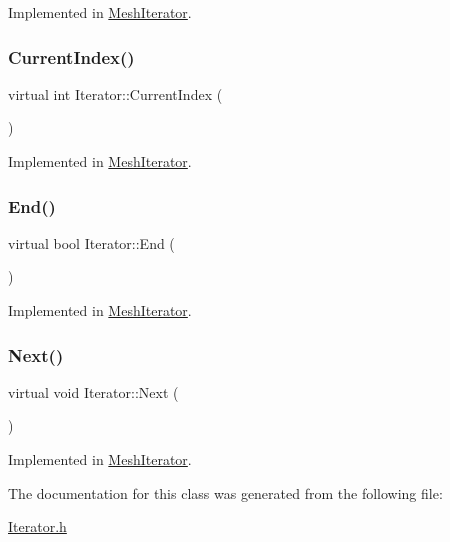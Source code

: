 Implemented in \mbox{\hyperlink{class_mesh_iterator_a07a9e1405ac4297b6300875b9084d946}{Mesh\+Iterator}}.

\mbox{\label{class_iterator_a5254a8ede30314e572c5f35e3a7f8e8c}} 
\subsubsection{\texorpdfstring{CurrentIndex()}{CurrentIndex()}}
{\footnotesize\ttfamily virtual int Iterator\+::\+Current\+Index (\begin{DoxyParamCaption}{ }\end{DoxyParamCaption})\hspace{0.3cm}{\ttfamily [pure virtual]}}



Implemented in \mbox{\hyperlink{class_mesh_iterator_a72853e5e422c2e0bdb1fc084d7fb5118}{Mesh\+Iterator}}.

\mbox{\label{class_iterator_a7cebd24c11b2f4577f72e228f849d092}} 
\subsubsection{\texorpdfstring{End()}{End()}}
{\footnotesize\ttfamily virtual bool Iterator\+::\+End (\begin{DoxyParamCaption}{ }\end{DoxyParamCaption})\hspace{0.3cm}{\ttfamily [pure virtual]}}



Implemented in \mbox{\hyperlink{class_mesh_iterator_aab37f952147b0b24bd22e469f23605fd}{Mesh\+Iterator}}.

\mbox{\label{class_iterator_a124e522942b3a5f058ad9091fe74c283}} 
\subsubsection{\texorpdfstring{Next()}{Next()}}
{\footnotesize\ttfamily virtual void Iterator\+::\+Next (\begin{DoxyParamCaption}{ }\end{DoxyParamCaption})\hspace{0.3cm}{\ttfamily [pure virtual]}}



Implemented in \mbox{\hyperlink{class_mesh_iterator_ab680a0183b6365f5ec200be9dbce011b}{Mesh\+Iterator}}.



The documentation for this class was generated from the following file\+:\begin{DoxyCompactItemize}
\item 
\mbox{\hyperlink{_iterator_8h}{Iterator.\+h}}\end{DoxyCompactItemize}
